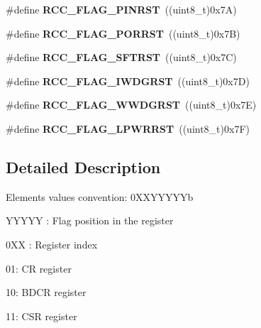 \begin{DoxyCompactItemize}
\item 
\#define {\bfseries R\+C\+C\+\_\+\+F\+L\+A\+G\+\_\+\+P\+I\+N\+R\+ST}~((uint8\+\_\+t)0x7\+A)\hypertarget{group___r_c_c___flag_gabfc3ab5d4a8a94ec1c9f38794ce37ad6}{}\label{group___r_c_c___flag_gabfc3ab5d4a8a94ec1c9f38794ce37ad6}

\item 
\#define {\bfseries R\+C\+C\+\_\+\+F\+L\+A\+G\+\_\+\+P\+O\+R\+R\+ST}~((uint8\+\_\+t)0x7\+B)\hypertarget{group___r_c_c___flag_ga39ad309070f416720207eece5da7dc2c}{}\label{group___r_c_c___flag_ga39ad309070f416720207eece5da7dc2c}

\item 
\#define {\bfseries R\+C\+C\+\_\+\+F\+L\+A\+G\+\_\+\+S\+F\+T\+R\+ST}~((uint8\+\_\+t)0x7\+C)\hypertarget{group___r_c_c___flag_gaf7852615e9b19f0b2dbc8d08c7594b52}{}\label{group___r_c_c___flag_gaf7852615e9b19f0b2dbc8d08c7594b52}

\item 
\#define {\bfseries R\+C\+C\+\_\+\+F\+L\+A\+G\+\_\+\+I\+W\+D\+G\+R\+ST}~((uint8\+\_\+t)0x7\+D)\hypertarget{group___r_c_c___flag_gaac46bac8a97cf16635ff7ffc1e6c657f}{}\label{group___r_c_c___flag_gaac46bac8a97cf16635ff7ffc1e6c657f}

\item 
\#define {\bfseries R\+C\+C\+\_\+\+F\+L\+A\+G\+\_\+\+W\+W\+D\+G\+R\+ST}~((uint8\+\_\+t)0x7\+E)\hypertarget{group___r_c_c___flag_gaa80b60b2d497ccd7b7de1075009999a7}{}\label{group___r_c_c___flag_gaa80b60b2d497ccd7b7de1075009999a7}

\item 
\#define {\bfseries R\+C\+C\+\_\+\+F\+L\+A\+G\+\_\+\+L\+P\+W\+R\+R\+ST}~((uint8\+\_\+t)0x7\+F)\hypertarget{group___r_c_c___flag_ga67049531354aed7546971163d02c9920}{}\label{group___r_c_c___flag_ga67049531354aed7546971163d02c9920}

\end{DoxyCompactItemize}


\subsection{Detailed Description}
Elements values convention\+: 0\+X\+X\+Y\+Y\+Y\+Y\+Yb
\begin{DoxyItemize}
\item Y\+Y\+Y\+YY \+: Flag position in the register
\item 0\+XX \+: Register index
\begin{DoxyItemize}
\item 01\+: CR register
\item 10\+: B\+D\+CR register
\item 11\+: C\+SR register 
\end{DoxyItemize}
\end{DoxyItemize}